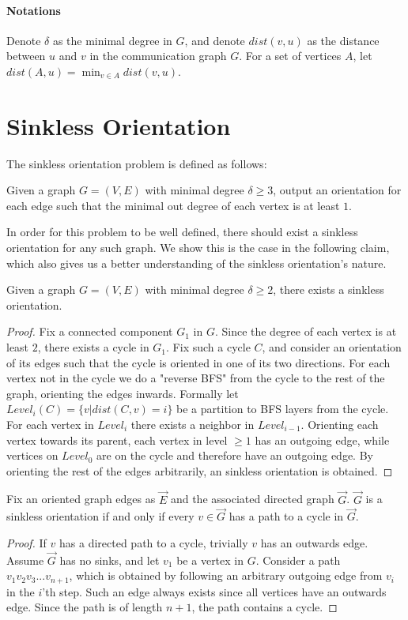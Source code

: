 \paragraph{Notations}
Denote $\delta$ as the minimal degree in $G$, and denote $dist(v,u)$ as the distance between $u$ and $v$ in the communication graph $G$. For a set of vertices $A$, let $dist(A,u) = \min_{v \in A}{dist(v,u)}$.

\section{Sinkless Orientation}
The sinkless orientation problem is defined as follows:
\begin{problem} Given a graph $G=(V,E)$ with minimal degree $\delta \geq 3$, output an orientation for each edge such that the minimal out degree of each vertex is at least $1$. 
\end{problem}

In order for this problem to be well defined, there should exist a sinkless orientation for any such graph. We show this is the case in the following claim, which also gives us a better understanding of the sinkless orientation's nature.

\begin{claim}
	Given a graph $G=(V,E)$ with minimal degree $\delta \geq 2$, there exists a sinkless orientation.
\end{claim}
\begin{proof}
	Fix a connected component $G_1$ in $G$. Since the degree of each vertex is at least $2$, there exists a cycle in $G_1$. Fix such a cycle $C$, and consider an orientation of its edges such that the cycle is oriented in one of its two directions. For each vertex not in the cycle we do a "reverse BFS" from the cycle to the rest of the graph, orienting the edges inwards. Formally let $Level_i(C) = \{v|dist(C,v) = i\}$ be a partition to BFS layers from the cycle. For each vertex in $Level_i$ there exists a neighbor in $Level_{i-1}$. Orienting each vertex towards its parent, each vertex in level $\geq 1$ has an outgoing edge, while vertices on $Level_0$ are on the cycle and therefore have an outgoing edge. By orienting the rest of the edges arbitrarily, an sinkless orientation is obtained.
\end{proof}


\begin{claim}
	Fix an oriented graph edges as $\vec{E}$ and the associated directed graph $\vec{G}$. $\vec{G}$ is a sinkless orientation if and only if every $v \in \vec{G}$ has a path to a cycle in $\vec{G}$.
\end{claim}
\begin{proof}
	If $v$ has a directed path to a cycle, trivially $v$ has an outwards edge. Assume $\vec{G}$ has no sinks, and let $v_1$ be a vertex in $G$. Consider a path $v_1v_2v_3...v_{n+1}$, which is obtained by following an arbitrary outgoing edge from $v_i$ in the $i$'th step. Such an edge always exists since all vertices have an outwards edge. Since the path is of length $n+1$, the path contains a cycle.
\end{proof}

